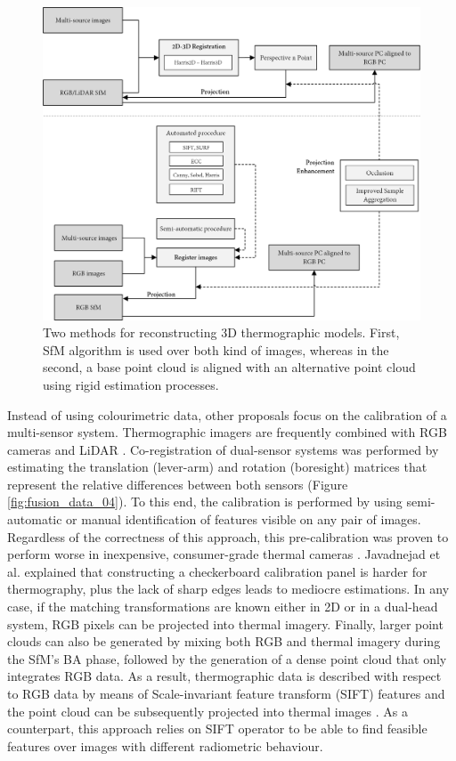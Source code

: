 \begin{figure}[!ht]
	\includegraphics[width=\linewidth]{figs/context/fusion_03.png}
	\caption{Two methods for reconstructing 3D thermographic models. First, SfM algorithm is used over both kind of images, whereas in the second, a base point cloud is aligned with an alternative point cloud using rigid estimation processes. }
    \label{fig:fusion_data_03}
\end{figure}

Instead of using colourimetric data, other proposals focus on the calibration of a multi-sensor system. Thermographic imagers are frequently combined with RGB cameras \cite{javadnejad_photogrammetric_2020, landmann_multimodal_2019, adan_fusion_2017} and LiDAR \cite{adan_fusion_2017, hoegner_fusion_2018}. Co-registration of dual-sensor systems was performed by estimating the translation (lever-arm) and rotation (boresight) matrices that represent the relative differences between both sensors (Figure \ref{fig:fusion_data_04}). To this end, the calibration is performed by using semi-automatic or manual identification of features visible on any pair of images. Regardless of the correctness of this approach, this pre-calibration was proven to perform worse in inexpensive, consumer-grade thermal cameras \cite{javadnejad_photogrammetric_2020}. Javadnejad et al. \cite{javadnejad_photogrammetric_2020} explained that constructing a checkerboard calibration panel is harder for thermography, plus the lack of sharp edges leads to mediocre estimations. In any case, if the matching transformations are known either in 2D or in a dual-head system, RGB pixels can be projected into thermal imagery. Finally, larger point clouds can also be generated by mixing both RGB and thermal imagery during the SfM's BA phase, followed by the generation of a dense point cloud that only integrates RGB data. As a result, thermographic data is described with respect to RGB data by means of Scale-invariant feature transform (SIFT) features and the point cloud can be subsequently projected into thermal images \cite{hoegner_3d_2016}. As a counterpart, this approach relies on SIFT operator to be able to find feasible features over images with different radiometric behaviour. 

